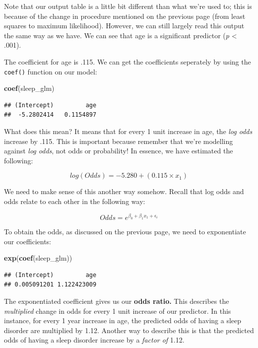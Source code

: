 \documentclass[
]{book}
\newenvironment{Shaded}{\begin{snugshade}}{\end{snugshade}}
\newcommand{\FunctionTok}[1]{\textcolor[rgb]{0.13,0.29,0.53}{\textbf{#1}}}
\newcommand{\NormalTok}[1]{#1}
\begin{document}
Note that our output table is a little bit different than what we're used to; this is because of the change in procedure mentioned on the previous page (from least squares to maximum likelihood). However, we can still largely read this output the same way as we have. We can see that age is a significant predictor (\emph{p} \textless{} .001).

The coefficient for age is .115. We can get the coefficients seperately by using the \texttt{coef()} function on our model:

\begin{Shaded}
\begin{Highlighting}[]
\FunctionTok{coef}\NormalTok{(sleep\_glm)}
\end{Highlighting}
\end{Shaded}

\begin{verbatim}
## (Intercept)         age 
##  -5.2802414   0.1154897
\end{verbatim}

What does this mean? It means that for every 1 unit increase in age, the \emph{log odds} increase by .115. This is important because remember that we're modelling against \emph{log odds}, not odds or probability! In essence, we have estimated the following:

\[
log(Odds) = -5.280 + (0.115 \times x_1) 
\]

We need to make sense of this another way somehow. Recall that log odds and odds relate to each other in the following way:

\[
Odds = e^{\beta_0 + \beta_1 x_1 + \epsilon_i}
\]

To obtain the odds, as discussed on the previous page, we need to exponentiate our coefficients:

\begin{Shaded}
\begin{Highlighting}[]
\FunctionTok{exp}\NormalTok{(}\FunctionTok{coef}\NormalTok{(sleep\_glm))}
\end{Highlighting}
\end{Shaded}

\begin{verbatim}
## (Intercept)         age 
## 0.005091201 1.122423009
\end{verbatim}

The exponentiated coefficient gives us our \textbf{odds ratio.} This describes the \emph{multiplied} change in odds for every 1 unit increase of our predictor. In this instance, for every 1 year increase in age, the predicted odds of having a sleep disorder are multiplied by 1.12. Another way to describe this is that the predicted odds of having a sleep disorder increase by a \emph{factor of} 1.12.
\end{document}
